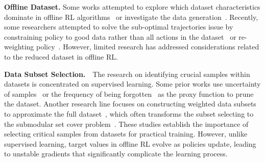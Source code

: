 \textbf{Offline Dataset.}
Some works attempted to explore which dataset characteristics dominate in offline RL algorithms~\citep{schweighofer2021understanding, swazinna2021measuring, chen2020bail, yue2022boosting} or investigate the data generation~\citep{yarats2022don}.
Recently, some researchers attempted to solve the sub-optimal trajectories issue by constraining policy to good data rather than all actions in the dataset~\citep{hong2023beyond} or re-weighting policy~\citep{hong2023harnessing}.
However, limited research has addressed considerations related to the reduced dataset in offline RL.

\textbf{Data Subset Selection.}\ \ The research on identifying crucial samples within datasets is concentrated on supervised learning.
Some prior works use uncertainty of samples~\citep{coleman2019selection,paul2021deep} or the frequency of being forgotten~\citep{toneva2018empirical} as the proxy function to prune the dataset.
Another research line focuses on constructing weighted data subsets to approximate the full dataset~\citep{feldman2020core}, which often transforms the subset selecting to the submodular set cover problem~\citep{wei2015submodularity,kaushal2019learning}.
These studies establish the importance of selecting critical samples from datasets for practical training. 
However, unlike supervised learning, target values in offline RL evolve as policies update, leading to unstable gradients that significantly complicate the learning process.

